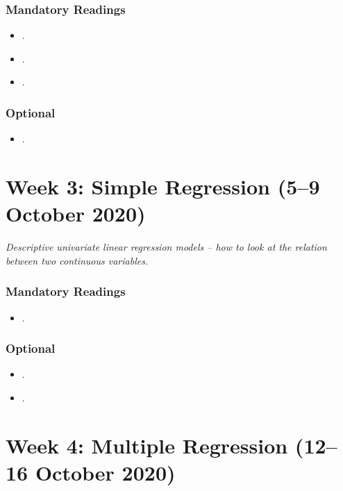 \documentclass[abstract=on,parskip=full,headings=standardclasses,fontsize=11pt,paper=a4]{scrartcl}
\begin{document}
\subsubsection*{Mandatory Readings}
\begin{itemize}
\item {}.
\item {}.
\item {}.
\end{itemize}

\subsubsection*{Optional}
\begin{itemize}
\item {}.
\end{itemize}





\section{Week 3: Simple Regression (5--9 October 2020)}

\textit{Descriptive univariate linear regression models -- how to look at the relation between two continuous variables.}


\subsubsection*{Mandatory Readings}

\begin{itemize}
\item {}.
\end{itemize}


\subsubsection*{Optional}
\begin{itemize}
\item {}.
\item {}.
\end{itemize}


\section{Week 4:  Multiple Regression (12--16 October 2020)}
\end{document}
